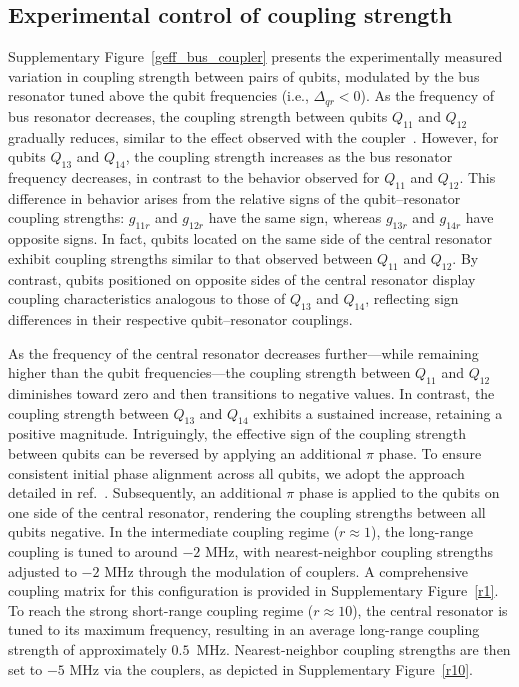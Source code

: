 \documentclass[reprint,superscriptaddress,preprintnumbers,longbibliography,
amsmath,amssymb,aps,floatfix,pra,twocolumn, tightenlines %
]{revtex4-2}
\begin{document}
	\subsection{Experimental control of coupling strength}

Supplementary Figure~\ref{geff_bus_coupler} presents the experimentally measured variation in coupling strength between pairs of qubits, modulated by the bus resonator tuned above the qubit frequencies (i.e., \( \Delta_{qr} < 0 \)). As the frequency of bus resonator decreases, the coupling strength between qubits \( Q_{11} \) and \( Q_{12} \) gradually reduces, similar to the effect observed with the coupler~\cite{yan_coupler_2018}. However, for qubits \( Q_{13} \) and \( Q_{14} \), the coupling strength increases as the bus resonator frequency decreases, in contrast to the behavior observed for \( Q_{11} \) and \( Q_{12} \). This difference in behavior arises from the relative signs of the qubit–resonator coupling strengths: \( g_{11r} \) and \( g_{12r} \) have the same sign, whereas \( g_{13r} \) and \( g_{14r} \) have opposite signs. In fact, qubits located on the same side of the central resonator exhibit coupling strengths similar to that observed between \( Q_{11} \) and \( Q_{12} \). By contrast, qubits positioned on opposite sides of the central resonator display coupling characteristics analogous to those of \( Q_{13} \) and \( Q_{14} \), reflecting sign differences in their respective qubit–resonator couplings.

As the frequency of the central resonator decreases further—while remaining higher than the qubit frequencies—the coupling strength between $Q_{11}$ and $Q_{12}$ diminishes toward zero and then transitions to negative values. In contrast, the coupling strength between $Q_{13}$ and $Q_{14}$ exhibits a sustained increase, retaining a positive magnitude. Intriguingly, the effective sign of the coupling strength between qubits can be reversed by applying an additional $\pi$ phase. To ensure consistent initial phase alignment across all qubits, we adopt the approach detailed in ref.~\cite{10_Qubit_2017}. 
Subsequently, an additional $\pi$ phase is applied to the qubits on one side of the central resonator, rendering the coupling strengths between all qubits negative.
In the intermediate coupling regime ($r \approx 1$), the long-range coupling is tuned to around $-2$ MHz, with nearest-neighbor coupling strengths adjusted to $-2$ MHz through the modulation of couplers. A comprehensive coupling matrix for this configuration is provided in Supplementary Figure~\ref{r1}.
To reach the strong short-range coupling regime (\(r \approx10\)), the central resonator is tuned to its maximum frequency, resulting in an average long-range coupling strength of approximately \(0.5\)~MHz. Nearest-neighbor coupling strengths are then set to $-5$ MHz via the couplers, as depicted in Supplementary Figure~\ref{r10}.
\end{document}
